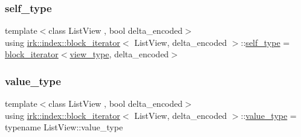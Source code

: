 \mbox{\label{classirk_1_1index_1_1block__iterator_a338ee8fee726492e9f8bbad4b4d75766}} 
\subsubsection{\texorpdfstring{self\+\_\+type}{self\_type}}
{\footnotesize\ttfamily template$<$class List\+View , bool delta\+\_\+encoded$>$ \\
using \mbox{\hyperlink{classirk_1_1index_1_1block__iterator}{irk\+::index\+::block\+\_\+iterator}}$<$ List\+View, delta\+\_\+encoded $>$\+::\mbox{\hyperlink{classirk_1_1index_1_1block__iterator_a338ee8fee726492e9f8bbad4b4d75766}{self\+\_\+type}} =  \mbox{\hyperlink{classirk_1_1index_1_1block__iterator}{block\+\_\+iterator}}$<$\mbox{\hyperlink{classirk_1_1index_1_1block__iterator_a75bc89b691db97f719af7284ee91afa0}{view\+\_\+type}}, delta\+\_\+encoded$>$}

\mbox{\label{classirk_1_1index_1_1block__iterator_a4d6c5b58cedd871e8a8f235e425e8587}} 
\subsubsection{\texorpdfstring{value\+\_\+type}{value\_type}}
{\footnotesize\ttfamily template$<$class List\+View , bool delta\+\_\+encoded$>$ \\
using \mbox{\hyperlink{classirk_1_1index_1_1block__iterator}{irk\+::index\+::block\+\_\+iterator}}$<$ List\+View, delta\+\_\+encoded $>$\+::\mbox{\hyperlink{classirk_1_1index_1_1block__iterator_a4d6c5b58cedd871e8a8f235e425e8587}{value\+\_\+type}} =  typename List\+View\+::value\+\_\+type}

\mbox{\label{classirk_1_1index_1_1block__iterator_a75bc89b691db97f719af7284ee91afa0}} 

